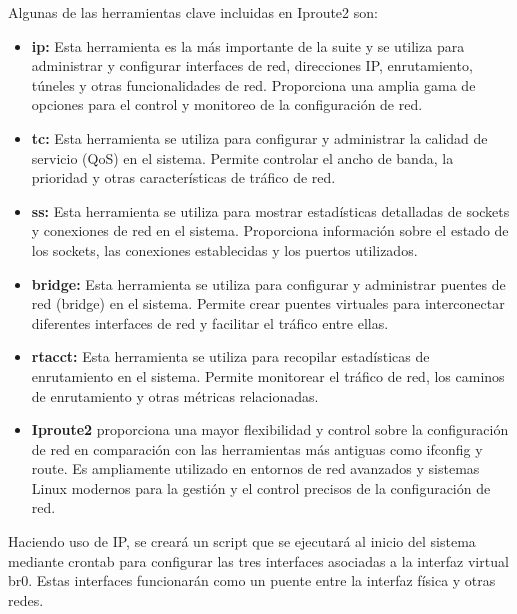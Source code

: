 		Algunas de las herramientas clave incluidas en Iproute2 son:
		
		\begin{itemize}
			
			\item\textbf{ip:} Esta herramienta es la más importante de la suite y se utiliza para administrar y configurar interfaces de red, direcciones IP, enrutamiento, túneles y otras funcionalidades de red. Proporciona una amplia gama de opciones para el control y monitoreo de la configuración de red.
		
			\item\textbf{tc:} Esta herramienta se utiliza para configurar y administrar la calidad de servicio (QoS) en el sistema. Permite controlar el ancho de banda, la prioridad y otras características de tráfico de red.
		
			\item\textbf{ss:} Esta herramienta se utiliza para mostrar estadísticas detalladas de sockets y conexiones de red en el sistema. Proporciona información sobre el estado de los sockets, las conexiones establecidas y los puertos utilizados.
		
			\item\textbf{bridge:} Esta herramienta se utiliza para configurar y administrar puentes de red (bridge) en el sistema. Permite crear puentes virtuales para interconectar diferentes interfaces de red y facilitar el tráfico entre ellas.
		
			\item\textbf{rtacct:} Esta herramienta se utiliza para recopilar estadísticas de enrutamiento en el sistema. Permite monitorear el tráfico de red, los caminos de enrutamiento y otras métricas relacionadas.
		
			\item\textbf{Iproute2} proporciona una mayor flexibilidad y control sobre la configuración de red en comparación con las herramientas más antiguas como ifconfig y route. Es ampliamente utilizado en entornos de red avanzados y sistemas Linux modernos para la gestión y el control precisos de la configuración de red.
		
			\end{itemize}
		
		
		Haciendo uso de IP, se creará un script que se ejecutará al inicio del sistema mediante crontab para configurar las tres interfaces 	asociadas a la interfaz virtual br0. Estas interfaces funcionarán como un puente entre la interfaz física y otras redes.\par
	
